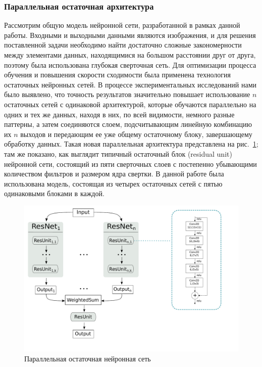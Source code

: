 \subsubsection{Параллельная остаточная архитектура}
Рассмотрим общую модель нейронной сети, разработанной в рамках данной работы. Входными и выходными данными являются изображения, и для решения поставленной задачи необходимо найти достаточно сложные закономерности между элементами данных, находящимися на большом расстоянии друг от друга, поэтому была использована глубокая сверточная сеть. Для оптимизации процесса обучения и повышения скорости сходимости была применена технология остаточных нейронных сетей. В процессе экспериментальных исследований нами было выявлено, что точность результатов значительно повышает использование $n$ остаточных сетей с одинаковой архитектурой, которые обучаются параллельно на одних и тех же данных, находя в них, по всей видимости, немного разные паттерны, а затем соединяются слоем, подсчитывающим линейную комбинацию их $n$ выходов и передающим ее уже общему остаточному блоку, завершающему обработку данных. Такая новая параллельная архитектура представлена на рис.~\ref{nn}; там же показано, как выглядит типичный остаточный блок (residual unit) нейронной сети, состоящий из пяти сверточных слоев с постепенно убывающими количеством фильтров и размером ядра свертки. В данной работе была использована модель, состоящая из четырех остаточных сетей с пятью одинаковыми блоками в каждой.

\begin{figure}[h]
\begin{center}
\centering
\includegraphics[width=15cm]{pics/nn.pdf}
\caption{Параллельная остаточная нейронная сеть}
\label{nn}
\end{center}
\end{figure} 